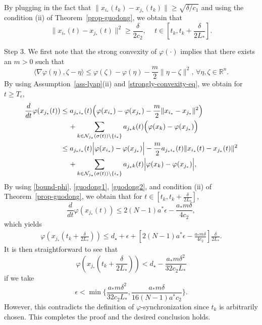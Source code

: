 \documentclass[a4paper, 11pt]{article}
\def\R{\mathbb{R}}
\begin{document}
By plugging in the fact that $\|x_{i_\ast}(t_k)-x_{j_\ast}(t_k)\| \geq \sqrt{\delta/c_1} $ and using the condition (ii) of Theorem~\ref{prop-guodong}, we obtain that
\begin{equation}\label{guodong1}
\|x_{i_\ast}(t)-x_{j_\ast}(t)\|^2  \geq \frac{\delta}{2c_2}, \quad \, t\in \left[t_k,t_k+ \frac{\delta}{2 L_\ast}\right].
\end{equation}

\vspace{2mm}

\noindent Step 3. We first note that the strong convexity of $\varphi(\cdot)$ implies that \cite[pp.459]{boyd-vandenberghe}
there exists an $m>0$ such that
\begin{equation}\label{strongly-convexity-eq}
\langle \nabla \varphi(\eta), \zeta-\eta \rangle \leq \varphi(\zeta)-\varphi(\eta)-\frac{m}{2}\|\eta-\zeta\|^2, \, \forall \eta,\zeta \in {\R}^n.
\end{equation}
By using Assumption~\ref{ass-lyap}(ii) and \eqref{strongly-convexity-eq}, we obtain for $t\geq T_\epsilon$,
\begin{align}\label{guodong2}
\frac{d}{dt}\varphi(x_{j_\ast}(t))
& \leq a_{j_\ast i_\ast }(t) \Big(\varphi(x_{i_\ast})-\varphi(x_{j_\ast})-\frac{m}{2}\|x_{i_\ast}-x_{j_\ast}\|^2\Big) \nonumber \\
& \hspace{0.4cm}+\sum _{k \in \mathcal{N}_{j_\ast}(\sigma(t))\setminus \{i_\ast\}} a_{j_\ast k}(t) \Big(\varphi(x_k)-\varphi(x_{j_\ast})\Big)\nonumber\\
& \leq  a_{j_\ast i_\ast }(t)  \Big|\varphi(x_{i_\ast})-\varphi(x_{j_\ast})\Big|
-\frac{m}{2}a_{j_\ast i_\ast }(t)\|x_{i_\ast}(t)-x_{j_\ast}(t)\|^2 \nonumber \\
& \hspace{0.4cm}+\sum _{k \in \mathcal{N}_{j_\ast}(\sigma(t))\setminus \{i_\ast\}} a_{j_\ast k}(t)\Big|\varphi(x_k)  -\varphi(x_{j_\ast})\Big|,
\end{align}
By using \eqref{bound-phi}, \eqref{guodong1}, \eqref{guodong2}, and condition (ii) of Theorem~\ref{prop-guodong},
we obtain that for $t\in \left[t_k,t_k+ \frac{\delta}{2 L_\ast}\right]$,
\begin{equation*}
\frac{d}{dt}\varphi(x_{j_\ast}(t)) \leq  2(N-1)a^\ast \epsilon -\frac{a_\ast m \delta}{4c_2}, \end{equation*}
which yields
\begin{align*}
\varphi(x_{j_\ast}(t_k+ \frac{\delta}{2 L_\ast}))  \leq d_\star + \epsilon + \left[2(N-1)a^\ast \epsilon -\frac{a_\ast m \delta}{4c_2}\right]\frac{\delta}{2 L_\ast}.
\end{align*}
It is then straightforward to see that
\begin{equation*}
\varphi(x_{j_\ast}(t_k+ \frac{\delta}{2 L_\ast})) < d_\star-\frac{a_\ast m \delta^2}{32 c_2 L_\ast}
\end{equation*}
if we take
\[
\epsilon < \min \Big\{ \frac{a_\ast m \delta^2}{32 c_2 L_\ast}, \frac{a_\ast m \delta}{16(N-1) a^* c_2} \Big\}.
\]
However, this contradicts  the definition of $\varphi$-synchronization since $t_k$ is arbitrarily chosen. This completes the proof and the desired conclusion holds.
\end{document}
